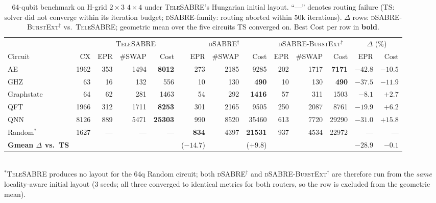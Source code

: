 \documentclass[conference]{IEEEtran}
\newcommand{\dSABRE}{\textsc{dSABRE}}
\newcommand{\BurstExt}{\textsc{dSABRE-BurstExt}}
\newcommand{\TeleSABRE}{\textsc{TeleSABRE}}
\begin{document}
\begin{table}[t]
\centering
\caption{64-qubit benchmark on H-grid $2\!\times\!3$ $4\!\times\!4$
under \TeleSABRE{}'s Hungarian initial layout.
``---'' denotes routing failure (TS: solver did not converge within
its iteration budget; \dSABRE-family: routing aborted within 50k iterations).
$\Delta$ rows: \BurstExt$^{\dagger}$ vs.\ \TeleSABRE; geometric mean over the
five circuits TS converged on. Best Cost per row in \textbf{bold}.}
\label{tab:64q}
\setlength{\tabcolsep}{4pt}
\begin{tabular}{@{}l r rrr rrr rrr rr@{}}
\toprule
 & & \multicolumn{3}{c}{\TeleSABRE}
 & \multicolumn{3}{c}{\dSABRE$^{\dagger}$}
 & \multicolumn{3}{c}{\BurstExt$^{\dagger}$}
 & \multicolumn{2}{c}{$\Delta$ (\%)} \\
\cmidrule(lr){3-5}\cmidrule(lr){6-8}\cmidrule(lr){9-11}\cmidrule(lr){12-13}
Circuit & CX & EPR & \#SWAP & Cost & EPR & \#SWAP & Cost & EPR & \#SWAP & Cost & EPR & Cost \\
\midrule
AE         & 1962 & 353 & 1494 & \textbf{8012} & 273 & 2185 & 9285 & 202 & 1717 & \textbf{7171} & $-42.8$ & $-10.5$ \\
GHZ        &   63 &  16 &  132 &  556  &  10 &  130 & \textbf{490}  &  10 &  130 & \textbf{490}  & $-37.5$ & $-11.9$ \\
Graphstate &   64 &  62 &  281 & 1463 &  54 &  292 & \textbf{1416} &  57 &  311 & 1503 & $-8.1$  & $+2.7$  \\
QFT        & 1966 & 312 & 1711 & \textbf{8253} & 301 & 2165 & 9505 & 250 & 2087 & 8761 & $-19.9$ & $+6.2$  \\
QNN        & 8126 & 889 & 5471 & \textbf{25303}& 990 & 8520 & 35460& 613 & 7720 & 29290& $-31.0$ & $+15.8$ \\
Random$^\ast$ & 1627 & --- & --- & --- & \textbf{834} & 4397 & \textbf{21531}& 937 & 4534 & 22972 & --- & --- \\
\midrule
\textbf{Gmean $\Delta$ vs.\ TS} & & & & & ($-14.7$) & & ($+9.8$) & & & & $\mathbf{-28.9}$ & $\mathbf{-0.1}$ \\
\bottomrule
\end{tabular}
\smallskip\\
\footnotesize $^{\ast}$\TeleSABRE{} produces no layout for the 64q Random
circuit; both \dSABRE$^{\dagger}$ and \BurstExt$^{\dagger}$ are therefore run
from the \emph{same} locality-aware initial layout (3 seeds; all three
converged to identical metrics for both routers, so the row is excluded from
the geometric mean).
\end{table}
\end{document}
